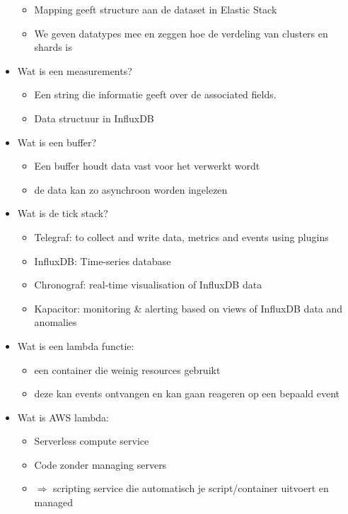 \documentclass{article}
\begin{document}
\begin{itemize}
    \begin{itemize}
        \item Mapping geeft structure aan de dataset in Elastic Stack
        \item We geven datatypes mee en zeggen hoe de verdeling van clusters en shards is
    \end{itemize}
    \item Wat is een measurements?
    \begin{itemize}
        \item Een string die informatie geeft over de associated fields.
        \item Data structuur in InfluxDB
    \end{itemize}
    \item Wat is een buffer? 
    \begin{itemize}
        \item Een buffer houdt data vast voor het verwerkt wordt
        \item de data kan zo asynchroon worden ingelezen
    \end{itemize}
	\item Wat is de tick stack? 
	\begin{itemize}
        \item Telegraf: to collect and write data, metrics and events using plugins
        \item InfluxDB: Time-series database
        \item Chronograf: real-time visualisation of InfluxDB data
        \item Kapacitor: monitoring \& alerting based on views of InfluxDB data and anomalies
    \end{itemize}
    \item Wat is een lambda functie:
    \begin{itemize}
        \item een container die weinig resources gebruikt
        \item deze kan events ontvangen en kan gaan reageren op een bepaald event
    \end{itemize}
    \item Wat is AWS lambda:
    \begin{itemize}
        \item Serverless compute service
        \item Code zonder managing servers
        \item $\Rightarrow$ scripting service die automatisch je script/container uitvoert en managed 

\end{itemize}
\end{itemize}
\end{document}
